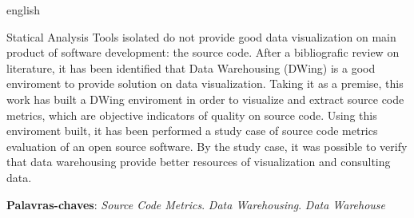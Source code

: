 \begin{resumo}[Abstract]
 \begin{otherlanguage*}{english}


 Statical Analysis Tools isolated do not provide good data visualization on main product of software development: the source code. After a bibliografic review on literature, it has been identified that Data Warehousing (DWing) is a good enviroment to provide solution on data visualization. Taking it as a premise, this work has built a DWing enviroment in order to visualize and extract source code metrics, which are objective indicators of quality on source code. Using this enviroment built, it has been performed a study case of source code metrics evaluation of an open source software. By the study case, it was possible to verify that data warehousing provide better resources of visualization and consulting data.

   \vspace{\onelineskip}
 
   \noindent 
    \textbf{Palavras-chaves}: \textit{Source Code Metrics}. \textit{Data Warehousing}. \textit{Data Warehouse}
 \end{otherlanguage*}
\end{resumo}
